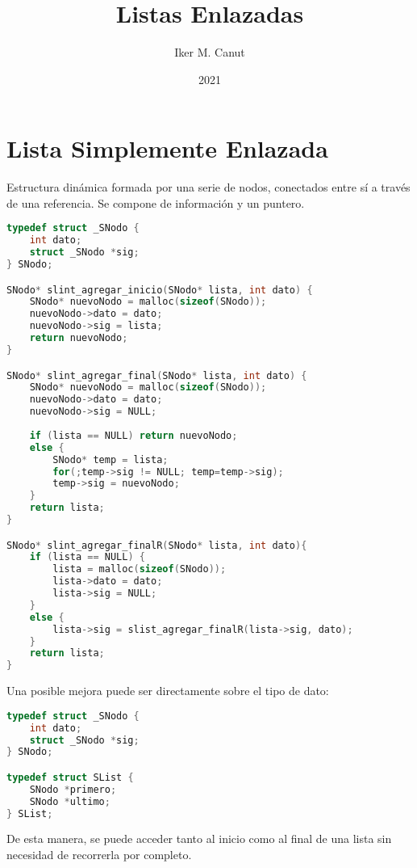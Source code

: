 \documentclass[11pt,a4paper]{article}
\author{Iker M. Canut}
\title{Listas Enlazadas}
\date{2021}
\begin{document}
\maketitle
\newpage

\section{Lista Simplemente Enlazada}
Estructura dinámica formada por una serie de nodos, conectados entre sí a través de una referencia. Se compone de informaci\'on y un puntero.
\begin{lstlisting}[language=C]
typedef struct _SNodo {
	int dato;
	struct _SNodo *sig;
} SNodo;

SNodo* slint_agregar_inicio(SNodo* lista, int dato) {
	SNodo* nuevoNodo = malloc(sizeof(SNodo));
	nuevoNodo->dato = dato;
	nuevoNodo->sig = lista;
	return nuevoNodo;
}

SNodo* slint_agregar_final(SNodo* lista, int dato) {
	SNodo* nuevoNodo = malloc(sizeof(SNodo));
	nuevoNodo->dato = dato;
	nuevoNodo->sig = NULL;
	
	if (lista == NULL) return nuevoNodo;
	else {
		SNodo* temp = lista;
		for(;temp->sig != NULL; temp=temp->sig);
		temp->sig = nuevoNodo;
	}	
	return lista;
}

SNodo* slint_agregar_finalR(SNodo* lista, int dato){
	if (lista == NULL) {
		lista = malloc(sizeof(SNodo));
		lista->dato = dato;
		lista->sig = NULL;
	}
	else {
		lista->sig = slist_agregar_finalR(lista->sig, dato);
	}
	return lista;
}
\end{lstlisting}

Una posible mejora puede ser directamente sobre el tipo de dato:
\begin{lstlisting}[language=C]
typedef struct _SNodo {
	int dato;
	struct _SNodo *sig;
} SNodo;

typedef struct SList {
	SNodo *primero;
	SNodo *ultimo;
} SList;
\end{lstlisting}
De esta manera, se puede acceder tanto al inicio como al final de una lista sin necesidad de recorrerla por completo.

\newpage
\end{document}
